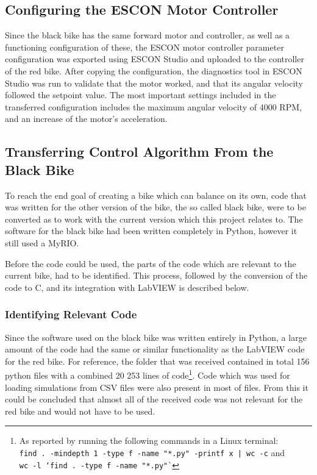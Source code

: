 \subsection{Configuring the ESCON Motor Controller} \label{methods:configESCON}

Since the black bike has the same forward motor and controller, as well as a functioning configuration of these, the ESCON motor controller parameter configuration was exported using ESCON Studio and uploaded to the controller of the red bike. After copying the configuration, the diagnostics tool in ESCON Studio was run to validate that the motor worked, and that its angular velocity followed the setpoint value. The most important settings included in the transferred configuration includes the maximum angular velocity of 4000 RPM, and an increase of the motor's acceleration.

\subsection{Transferring Control Algorithm From the Black Bike}

To reach the end goal of creating a bike which can balance on its own, code that was written for the other version of the bike, the so called black bike, were to be converted as to work with the current version which this project relates to. The software for the black bike had been written completely in Python, however it still used a MyRIO. 

Before the code could be used, the parts of the code which are relevant to the current bike, had to be identified. This process, followed by the conversion of the code to C, and its integration with LabVIEW is described below.

\subsubsection{Identifying Relevant Code}

Since the software used on the black bike was written entirely in Python, a large amount of the code had the same or similar functionality as the LabVIEW code for the red bike. For reference, the folder that was received contained in total 156 python files with a combined 20 253 lines of code\footnote{As reported by running the following commands in a Linux terminal:\\\texttt{find . -mindepth 1 -type f -name "*.py" -printf x | wc -c} and\\\texttt{wc -l `find . -type f -name "*.py"`}}. Code which was used for loading simulations from CSV files were also present in most of files. From this it could be concluded that almost all of the received code was not relevant for the red bike and would not have to be used.

